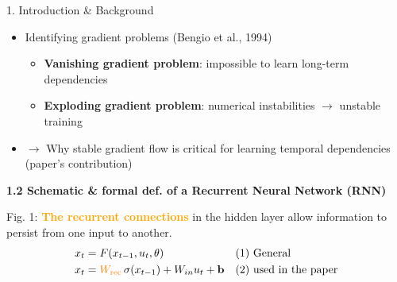 \documentclass[final]{beamer}
\begin{document}
\begin{frame}[t]
\begin{columns}[t,totalwidth=\textwidth]
\begin{column}{0.3\textwidth}
\begin{block}{1. Introduction \& Background}
\begin{itemize}
            \item Identifying gradient problems (Bengio et al., 1994)
            \begin{itemize}
                \item \textbf{Vanishing gradient problem}: impossible to learn long-term dependencies
                \item \textbf{Exploding gradient problem}: numerical instabilities $\rightarrow$ unstable training
            \end{itemize}

            \item $\rightarrow$ Why stable gradient flow is critical for learning temporal dependencies (paper's contribution)
            \end{itemize}

        \vspace{1em}

        \textbf{1.2 Schematic \& formal def. of a Recurrent Neural Network (RNN)}


        \begin{center}
       \end{center}
       
{{Fig. 1: \textcolor{orange}{\textbf{The recurrent connections}} in the hidden layer allow information to persist from one input to another.}}
   \begin{align*}
     x_t &= F(x_{t-1}, u_t, \theta) && \text{(1) General} \\
     x_t &= \textcolor{orange}{W_{\text{rec}}} \, \sigma(x_{t-1}) + W_{in} u_t + \mathbf{b} && \text{(2) used in the paper}
   \end{align*}


\end{block}
\end{column}
\end{columns}
\end{frame}
\end{document}
